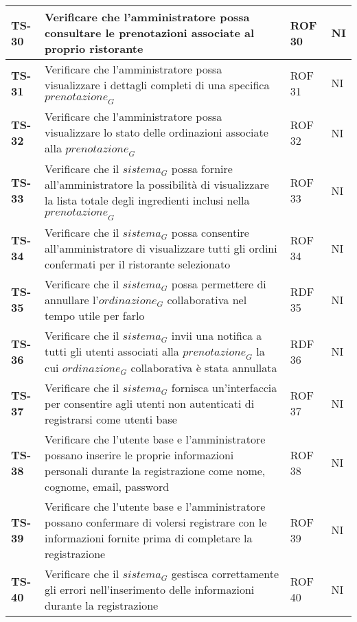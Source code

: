 \begin{longtable}{|>{\centering\arraybackslash}p{1.5cm}|p{12cm}|p{2cm}|p{1cm}|}
  \hline
  \rowcolor{gray!10}
  \textbf{TS-30} & Verificare che l'amministratore possa consultare le prenotazioni associate al proprio ristorante & ROF 30 & NI \\ 
  \hline
  \rowcolor{gray!10}
  \textbf{TS-31} & Verificare che l'amministratore possa visualizzare i dettagli completi di una specifica $\textit{prenotazione}_G$ & ROF 31 & NI \\ 
  \hline
  \rowcolor{gray!10}
  \textbf{TS-32} & Verificare che l'amministratore possa visualizzare lo stato delle ordinazioni associate alla $\textit{prenotazione}_G$ & ROF 32 & NI \\ 
  \hline
  \rowcolor{gray!10}
  \textbf{TS-33} & Verificare che il $\textit{sistema}_G$ possa fornire all'amministratore la possibilità di visualizzare la lista totale degli ingredienti inclusi nella $\textit{prenotazione}_G$ & ROF 33 & NI \\ 
  \hline
  \rowcolor{gray!10}
  \textbf{TS-34} & Verificare che il $\textit{sistema}_G$ possa consentire all'amministratore di visualizzare tutti gli ordini confermati per il ristorante selezionato & ROF 34 & NI \\ 
  \hline
  \rowcolor{gray!10}
  \textbf{TS-35} & Verificare che il $\textit{sistema}_G$ possa permettere di annullare l'$\textit{ordinazione}_G$ collaborativa nel tempo utile per farlo & RDF 35 & NI \\
  \hline
  \rowcolor{gray!10}
  \textbf{TS-36} & Verificare che il $\textit{sistema}_G$ invii una notifica a tutti gli utenti associati alla $\textit{prenotazione}_G$ la cui $\textit{ordinazione}_G$ collaborativa è stata annullata & RDF 36 & NI \\ 
  \hline
  \rowcolor{gray!10}
  \textbf{TS-37} & Verificare che il $\textit{sistema}_G$ fornisca un'interfaccia per consentire agli utenti non autenticati di registrarsi come utenti base & ROF 37 & NI \\ 
  \hline
  \rowcolor{gray!10}
  \textbf{TS-38} & Verificare che l'utente base e l'amministratore possano inserire le proprie informazioni personali durante la registrazione come nome, cognome, email, password & ROF 38 & NI \\
  \hline
  \rowcolor{gray!10}
  \textbf{TS-39} & Verificare che l'utente base e l'amministratore possano confermare di volersi registrare con le informazioni fornite prima di completare la registrazione & ROF 39 & NI \\ 
  \hline
  \rowcolor{gray!10}
  \textbf{TS-40} & Verificare che il $\textit{sistema}_G$ gestisca correttamente gli errori nell'inserimento delle informazioni durante la registrazione & ROF 40 & NI \\ 

\end{longtable}
